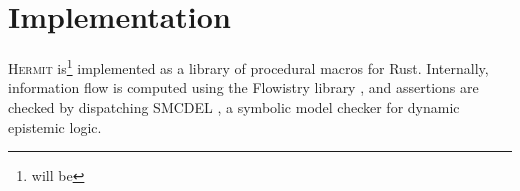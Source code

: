 \documentclass[letterpaper,twocolumn,10pt]{article}
\newcommand{\Hermit}{\textsc{Hermit}}
\begin{document}



\section{Implementation}

\Hermit{} is\footnote{will be} implemented as a library of procedural macros for Rust. Internally,
information flow is computed using the Flowistry library \cite{crichton_2022a}, and assertions are
checked by dispatching SMCDEL \cite{gattinger_2018a}, a symbolic model checker for dynamic epistemic
logic.



\end{document}
